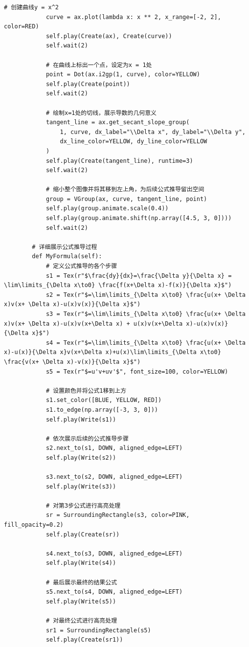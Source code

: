 \begin{example}
\begin{lstlisting}[style=pythonstyle]
            # 创建曲线y = x^2
            curve = ax.plot(lambda x: x ** 2, x_range=[-2, 2], color=RED)
            self.play(Create(ax), Create(curve))
            self.wait(2)
    
            # 在曲线上标出一个点，设定为x = 1处
            point = Dot(ax.i2gp(1, curve), color=YELLOW)
            self.play(Create(point))
            self.wait(2)
    
            # 绘制x=1处的切线，展示导数的几何意义
            tangent_line = ax.get_secant_slope_group(
                1, curve, dx_label="\\Delta x", dy_label="\\Delta y",
                dx_line_color=YELLOW, dy_line_color=YELLOW
            )
            self.play(Create(tangent_line), runtime=3)
            self.wait(2)
    
            # 缩小整个图像并将其移到左上角，为后续公式推导留出空间
            group = VGroup(ax, curve, tangent_line, point)
            self.play(group.animate.scale(0.4))
            self.play(group.animate.shift(np.array([4.5, 3, 0])))
            self.wait(2)
    
        # 详细展示公式推导过程
        def MyFormula(self):
            # 定义公式推导的各个步骤
            s1 = Tex(r"$\frac{dy}{dx}=\frac{\Delta y}{\Delta x} = \lim\limits_{\Delta x\to0} \frac{f(x+\Delta x)-f(x)}{\Delta x}$")
            s2 = Tex(r"$=\lim\limits_{\Delta x\to0} \frac{u(x+ \Delta x)v(x+ \Delta x)-u(x)v(x)}{\Delta x}$")
            s3 = Tex(r"$=\lim\limits_{\Delta x\to0} \frac{u(x+ \Delta x)v(x+ \Delta x)-u(x)v(x+\Delta x) + u(x)v(x+\Delta x)-u(x)v(x)}{\Delta x}$")
            s4 = Tex(r"$=\lim\limits_{\Delta x\to0} \frac{u(x+ \Delta x)-u(x)}{\Delta x}v(x+\Delta x)+u(x)\lim\limits_{\Delta x\to0} \frac{v(x+ \Delta x)-v(x)}{\Delta x}$")
            s5 = Tex(r"$=u'v+uv'$", font_size=100, color=YELLOW)
    
            # 设置颜色并将公式1移到上方
            s1.set_color([BLUE, YELLOW, RED])
            s1.to_edge(np.array([-3, 3, 0]))
            self.play(Write(s1))
    
            # 依次展示后续的公式推导步骤
            s2.next_to(s1, DOWN, aligned_edge=LEFT)
            self.play(Write(s2))
    
            s3.next_to(s2, DOWN, aligned_edge=LEFT)
            self.play(Write(s3))
    
            # 对第3步公式进行高亮处理
            sr = SurroundingRectangle(s3, color=PINK, fill_opacity=0.2)
            self.play(Create(sr))
    
            s4.next_to(s3, DOWN, aligned_edge=LEFT)
            self.play(Write(s4))
    
            # 最后展示最终的结果公式
            s5.next_to(s4, DOWN, aligned_edge=LEFT)
            self.play(Write(s5))
    
            # 对最终公式进行高亮处理
            sr1 = SurroundingRectangle(s5)
            self.play(Create(sr1))
    \end{lstlisting}
\end{example}




